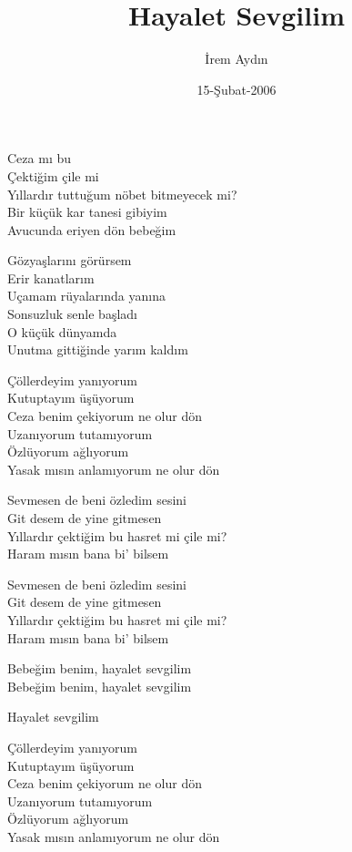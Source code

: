 \documentclass[twocolumn]{article}
\title{Hayalet Sevgilim}
\author{\.{I}rem Ayd{\i}n}
\date{15-\c{S}ubat-2006}
\begin{document}
\maketitle

Ceza m{\i} bu\\
\c{C}ekti\u{g}im \c{c}ile mi\\
Y{\i}llard{\i}r tuttu\u{g}um n\"{o}bet bitmeyecek mi?\\
Bir k\"{u}\c{c}\"{u}k kar tanesi gibiyim\\
Avucunda eriyen d\"{o}n bebe\u{g}im

G\"{o}zyaşlar{\i}n{\i} g\"{o}r\"{u}rsem\\
Erir kanatlar{\i}m\\
U\c{c}amam r\"{u}yalar{\i}nda yan{\i}na\\
Sonsuzluk senle başlad{\i}\\
O k\"{u}\c{c}\"{u}k d\"{u}nyamda\\
Unutma gitti\u{g}inde yar{\i}m kald{\i}m

\c{C}\"{o}llerdeyim yan{\i}yorum\\
Kutuptay{\i}m \"{u}ş\"{u}yorum\\
Ceza benim \c{c}ekiyorum ne olur d\"{o}n\\
Uzan{\i}yorum tutam{\i}yorum\\
\"{O}zl\"{u}yorum a\u{g}l{\i}yorum\\
Yasak m{\i}s{\i}n anlam{\i}yorum ne olur d\"{o}n

Sevmesen de beni \"{o}zledim sesini\\
Git desem de yine gitmesen\\
Y{\i}llard{\i}r \c{c}ekti\u{g}im bu hasret mi \c{c}ile mi?\\
Haram m{\i}s{\i}n bana bi' bilsem

Sevmesen de beni \"{o}zledim sesini\\
Git desem de yine gitmesen\\
Y{\i}llard{\i}r \c{c}ekti\u{g}im bu hasret mi \c{c}ile mi?\\
Haram m{\i}s{\i}n bana bi' bilsem

Bebe\u{g}im benim, hayalet sevgilim\\
Bebe\u{g}im benim, hayalet sevgilim

Hayalet sevgilim

\c{C}\"{o}llerdeyim yan{\i}yorum\\
Kutuptay{\i}m \"{u}ş\"{u}yorum\\
Ceza benim \c{c}ekiyorum ne olur d\"{o}n\\
Uzan{\i}yorum tutam{\i}yorum\\
\"{O}zl\"{u}yorum a\u{g}l{\i}yorum\\
Yasak m{\i}s{\i}n anlam{\i}yorum ne olur d\"{o}n
\end{document}
